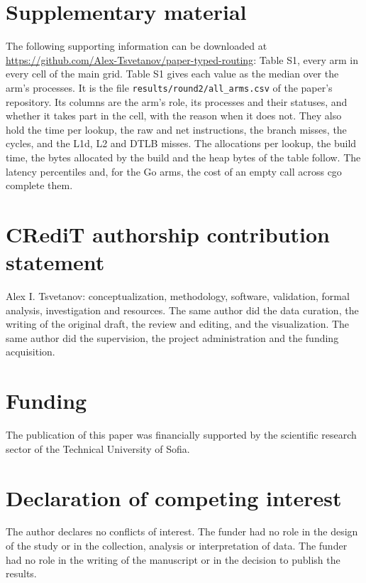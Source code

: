 \documentclass[preprint,12pt,authoryear]{elsarticle}
\newcommand{\PaperRepoURL}{\url{https://github.com/Alex-Tsvetanov/paper-typed-routing}}
\begin{document}









\appendix


\section*{Supplementary material}

The following supporting information can be downloaded at
\PaperRepoURL: Table S1, every arm in every cell of
the main grid. Table S1 gives each value as the median over the arm's processes. It is the file
\texttt{results/round2/all\_arms.csv} of the paper's repository. Its columns are the arm's role, its processes and their statuses, and whether it takes part in the
cell, with the reason when it does not. They also hold the time per lookup, the raw and net
instructions, the branch misses, the cycles, and the L1d, L2 and DTLB misses. The allocations per
lookup, the build time, the bytes allocated by the build and the heap bytes of the table follow.
The latency percentiles and, for the Go arms, the cost of an empty call across cgo complete them.

\section*{CRediT authorship contribution statement}

Alex I. Tsvetanov: conceptualization, methodology, software, validation, formal analysis, investigation and resources.
The same author did the data curation, the writing of the original draft, the review and editing, and the visualization.
The same author did the supervision, the project administration and the funding acquisition.

\section*{Funding}

The publication of this paper was financially supported by the scientific research sector of the Technical University of Sofia.

\section*{Declaration of competing interest}

The author declares no conflicts of interest.
The funder had no role in the design of the study or in the collection, analysis or interpretation of data.
The funder had no role in the writing of the manuscript or in the decision to publish the results.
\end{document}
